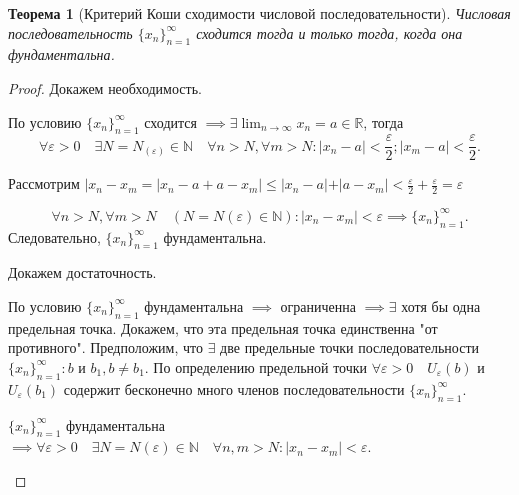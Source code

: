 \documentclass[a4paper,12pt]{article} %
\newtheorem{theorem}{Теорема}[subsection]
\theoremstyle{remark}
\begin{document}
\begin{theorem}[Критерий Коши сходимости числовой последовательности]
	Числовая последовательность $\{x_n\}_{n=1}^{\infty}$ сходится тогда и только тогда, когда она фундаментальна.	
\end{theorem}
\begin{proof}
	Докажем необходимость.

	По условию $\{x_n\}_{n=1}^{\infty}$ сходится $\implies \exists \lim_{n \to \infty} x_n = a \in  \mathbb{R}$, тогда 
	\[
		\forall \varepsilon>0 \quad \exists N=N_(\varepsilon)\in \mathbb{N} \quad \forall n>N, \forall m>N : |x_{n} - a| <\frac{\varepsilon}{2}; |x_{m}-a|<\frac{\varepsilon}{2}
	.\]

	Рассмотрим $|x_{n}-x_{m} = | x_{n} - a + a - x_{m}| \le  |x_{n}-a| + |a-x_{m}| < \frac{\varepsilon}{2} + \frac{\varepsilon}{2} = \varepsilon$

	\[
	\forall  n>N, \forall m>N \quad (N=N(\varepsilon)\in \mathbb{N}) : |x_{n}-x_{m}|<\varepsilon \implies \{x_n\}_{n=1}^{\infty}
	.\] 
	Следовательно, $\{x_n\}_{n=1}^{\infty}$ фундаментальна.

	Докажем достаточность.

	По условию $\{x_n\}_{n=1}^{\infty}$ фундаментальна $\implies$ ограниченна $\implies \exists $ хотя бы одна предельная точка. Докажем, что эта предельная точка единственна "от противного". Предположим, что $\exists $ две предельные точки  последовательности $\{x_n\}_{n=1}^{\infty} : b$ и $b_1, b\neq b_1$. По определению предельной точки $\forall \varepsilon>0 \quad U_\varepsilon(b)$ и $U_\varepsilon(b_1)$  содержит бесконечно много членов последовательности $\{x_n\}_{n=1}^{\infty}$.

	$\{x_n\}_{n=1}^{\infty}$ фундаментальна $\implies \forall \varepsilon>0 \quad \exists N=N(\varepsilon)\in \mathbb{N} \quad \forall n,m>N : |x_n - x_{m}| < \varepsilon$.
\begin{center}
\end{center}


\end{proof}
\end{document}
